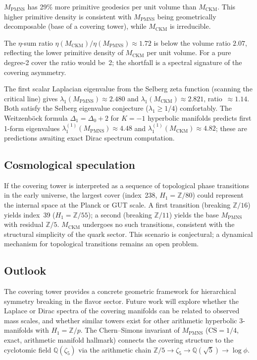﻿\documentclass[12pt]{article}
\theoremstyle{definition}
\begin{document}
$M_\text{PMNS}$ has 29\% more primitive geodesics per unit volume than
$M_\text{CKM}$. This higher primitive density is consistent with
$M_\text{PMNS}$ being geometrically decomposable (base of a covering
tower), while $M_\text{CKM}$ is irreducible.

The $\eta$-sum ratio $\eta(M_\text{CKM})/\eta(M_\text{PMNS})\approx 1.72$
is below the volume ratio $2.07$, reflecting the lower primitive density
of $M_\text{CKM}$ per unit volume. For a pure degree-2 cover the ratio
would be~2; the shortfall is a spectral signature of the covering
asymmetry.

The first scalar Laplacian eigenvalue from the Selberg zeta function
(scanning the critical line) gives $\lambda_1(M_\text{PMNS})\approx 2.480$
and $\lambda_1(M_\text{CKM})\approx 2.821$, ratio~$\approx 1.14$.
Both satisfy the Selberg eigenvalue conjecture ($\lambda_1\geq 1/4$)
comfortably. The Weitzenb\"{o}ck formula $\Delta_1=\Delta_0+2$ for
$K=-1$ hyperbolic manifolds predicts first 1-form eigenvalues
$\lambda_1^{(1)}(M_\text{PMNS})\approx 4.48$ and
$\lambda_1^{(1)}(M_\text{CKM})\approx 4.82$; these are predictions
awaiting exact Dirac spectrum computation.

\subsection{Cosmological speculation}
\label{subsec:cosm_covering}

If the covering tower is interpreted as a sequence of topological
phase transitions in the early universe, the largest cover (index~238,
$H_1=\mathbb{Z}/80$) could represent the internal space at the Planck
or GUT scale. A first transition (breaking $\mathbb{Z}/16$) yields
index~39 ($H_1=\mathbb{Z}/55$); a second (breaking $\mathbb{Z}/11$)
yields the base $M_\text{PMNS}$ with residual $\mathbb{Z}/5$.
$M_\text{CKM}$ undergoes no such transitions, consistent with the
structural simplicity of the quark sector. This scenario is
conjectural; a dynamical mechanism for topological transitions
remains an open problem.

\subsection{Outlook}

The covering tower provides a concrete geometric framework for
hierarchical symmetry breaking in the flavor sector. Future work
will explore whether the Laplace or Dirac spectra of the covering
manifolds can be related to observed mass scales, and whether
similar towers exist for other arithmetic hyperbolic 3-manifolds
with $H_1=\mathbb{Z}/p$. The Chern--Simons invariant of $M_\text{PMNS}$
($\mathrm{CS}=1/4$, exact, arithmetic manifold hallmark) connects
the covering structure to the cyclotomic field
$\mathbb{Q}(\zeta_5)$ via the arithmetic chain
$\mathbb{Z}/5\to\zeta_5\to\mathbb{Q}(\sqrt{5})\to\log\phi$.
\end{document}
